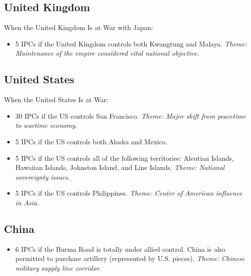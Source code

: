 \documentclass[10pt,twoside]{article}
\begin{document}
\begin{multicols*}{3}
\subsection*{United Kingdom}
When the United Kingdom Is at War with Japan:
\begin{itemize}
\item 5 IPCs if the United Kingdom controls both Kwangtung
and Malaya. \textsl{Theme: Maintenance of the empire considered vital national objective.}
\end{itemize}

\subsection*{United States}
When the United States Is at War:
\begin{itemize}
\item 30 IPCs if the US controls San Francisco. \textsl{Theme: Major shift from peacetime to wartime economy.}
\item 5 IPCs if the US controls both Alaska and Mexico.
\item 5 IPCs if the US controls all of the following territories: Aleutian Islands, Hawaiian Islands, Johnston Island, and Line Islands. \textsl{Theme: National sovereignty issues.}
\item 5 IPCs if the US controls Philippines. \textsl{Theme: Center of American influence in Asia.}
\end{itemize}

\subsection*{China}
\begin{itemize}
\item 6 IPCs if the Burma Road is totally under allied control. China is also permitted to purchase artillery (represented by U.S. pieces). \textsl{Theme: Chinese military supply line corridor.}
\end{itemize}


\end{multicols*}
\end{document}
